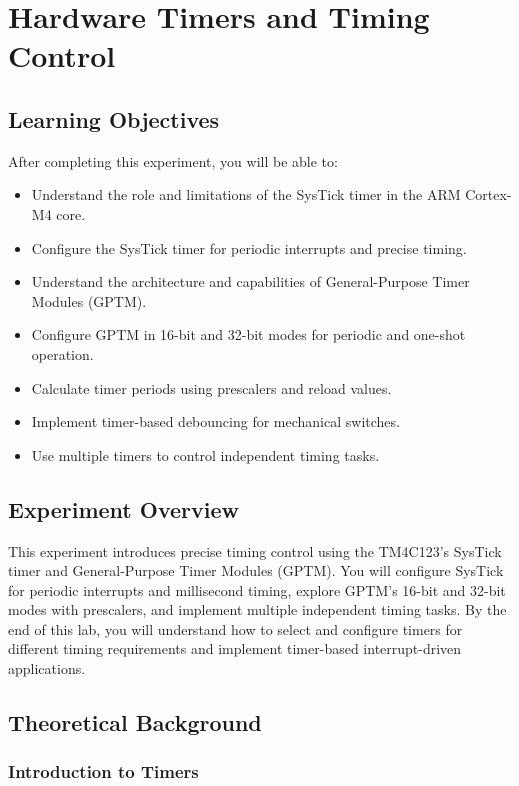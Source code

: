 \chapter{Hardware Timers and Timing Control}

\section*{Learning Objectives}
After completing this experiment, you will be able to:
\begin{itemize}[nosep]
  \item Understand the role and limitations of the SysTick timer in the ARM Cortex-M4 core.
  \item Configure the SysTick timer for periodic interrupts and precise timing.
  \item Understand the architecture and capabilities of General-Purpose Timer Modules (GPTM).
  \item Configure GPTM in 16-bit and 32-bit modes for periodic and one-shot operation.
  \item Calculate timer periods using prescalers and reload values.
  \item Implement timer-based debouncing for mechanical switches.
  \item Use multiple timers to control independent timing tasks.
\end{itemize}

\section*{Experiment Overview}
This experiment introduces precise timing control using the TM4C123's SysTick timer and General-Purpose Timer Modules (GPTM). You will configure SysTick for periodic interrupts and millisecond timing, explore GPTM's 16-bit and 32-bit modes with prescalers, and implement multiple independent timing tasks. By the end of this lab, you will understand how to select and configure timers for different timing requirements and implement timer-based interrupt-driven applications.

\newpage




\section{Theoretical Background}

\subsection{Introduction to Timers}

